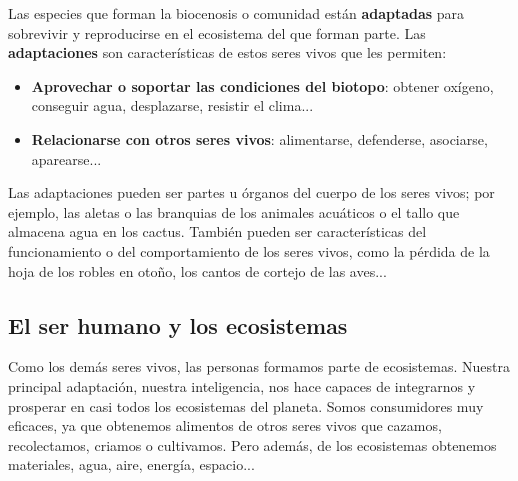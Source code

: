 Las especies que forman la biocenosis o comunidad están \textbf{adaptadas} para sobrevivir y reproducirse en el ecosistema del que forman parte. Las \textbf{adaptaciones} son características de estos seres vivos que les permiten:
\begin{itemize}
    \item \textbf{Aprovechar o soportar las condiciones del biotopo}: obtener oxígeno, conseguir agua, desplazarse, resistir el clima...
    \item \textbf{Relacionarse con otros seres vivos}: alimentarse, defenderse, asociarse, aparearse...
\end{itemize}
Las adaptaciones pueden ser partes u órganos del cuerpo de los seres vivos; por ejemplo, las aletas o las branquias de los animales acuáticos o el tallo que almacena agua en los cactus. También pueden ser características del funcionamiento o del comportamiento de los seres vivos, como la pérdida de la hoja de los robles en otoño, los cantos de cortejo de las aves...

\subsection{El ser humano y los ecosistemas}

Como los demás seres vivos, las personas formamos parte de ecosistemas. Nuestra principal adaptación, nuestra inteligencia, nos hace capaces de integrarnos y prosperar en casi todos los ecosistemas del planeta. Somos consumidores muy eficaces, ya que obtenemos alimentos de otros seres vivos que cazamos, recolectamos, criamos o cultivamos. Pero además, de los ecosistemas obtenemos materiales, agua, aire, energía, espacio...

